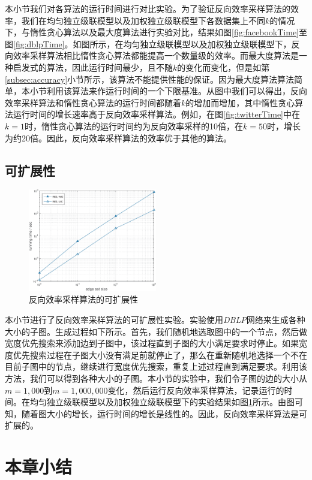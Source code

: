 本小节我们对各算法的运行时间进行对比实验。为了验证反向效率采样算法的效率，我们在均匀独立级联模型以及加权独立级联模型下各数据集上不同$k$的情况下，与惰性贪心算法以及最大度算法进行实验对比，结果如图\ref{fig:facebookTime}至图\ref{fig:dblpTime}。如图所示，在均匀独立级联模型以及加权独立级联模型下，反向效率采样算法相比惰性贪心算法都能提高一个数量级的效率。而最大度算法是一种启发式的算法，因此运行时间最少，且不随$k$的变化而变化，但是如第\ref{subsec:accuracy}小节所示，该算法不能提供性能的保证。因为最大度算法算法简单，本小节利用该算法来作运行时间的一个下限基准。从图中我们可以得出，反向效率采样算法和惰性贪心算法的运行时间都随着$k$的增加而增加，其中惰性贪心算法运行时间的增长速率高于反向效率采样算法。例如，在图\ref{fig:twitterTime}中在$k=1$时，惰性贪心算法的运行时间约为反向效率采样的10倍，在$k=50$时，增长为约20倍。因此，反向效率采样算法的效率优于其他的算法。

\subsection{可扩展性}
\label{subsec:scalability}
\begin{figure}[ht]
    \centering
    \includegraphics[width=0.5\textwidth]{figures/resScalability.eps}
    \caption{反向效率采样算法的可扩展性}
    \label{fig:scalability}
\end{figure}

本小节进行了反向效率采样算法的可扩展性实验。实验使用\textit{DBLP}网络来生成各种大小的子图。生成过程如下所示。首先，我们随机地选取图中的一个节点，然后做宽度优先搜索来添加边到子图中，该过程直到子图的大小满足要求时停止。如果宽度优先搜索过程在子图大小没有满足前就停止了，那么在重新随机地选择一个不在目前子图中的节点，继续进行宽度优先搜索，重复上述过程直到满足要求。利用该方法，我们可以得到各种大小的子图。本小节的实验中，我们令子图的边的大小从$m=1,000$到$m=1,000,000$变化，然后运行反向效率采样算法，记录运行的时间。在均匀独立级联模型以及加权独立级联模型下的实验结果如图\ref{fig:scalability}所示。由图可知，随着图大小的增长，运行时间的增长是线性的。因此，反向效率采样算法是可扩展的。
\section{本章小结}
\label{3sec:conclusion}

